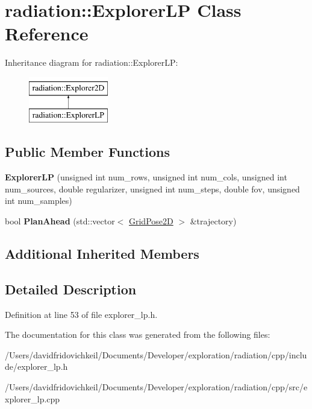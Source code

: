 \hypertarget{classradiation_1_1_explorer_l_p}{}\section{radiation\+:\+:Explorer\+LP Class Reference}
\label{classradiation_1_1_explorer_l_p}
Inheritance diagram for radiation\+:\+:Explorer\+LP\+:\begin{figure}[H]
\begin{center}
\leavevmode
\includegraphics[height=2.000000cm]{classradiation_1_1_explorer_l_p}
\end{center}
\end{figure}
\subsection*{Public Member Functions}
\begin{DoxyCompactItemize}
\item 
\hypertarget{classradiation_1_1_explorer_l_p_a3d37154001011ae4a81c5ee7d26b8f62}{}\label{classradiation_1_1_explorer_l_p_a3d37154001011ae4a81c5ee7d26b8f62} 
{\bfseries Explorer\+LP} (unsigned int num\+\_\+rows, unsigned int num\+\_\+cols, unsigned int num\+\_\+sources, double regularizer, unsigned int num\+\_\+steps, double fov, unsigned int num\+\_\+samples)
\item 
\hypertarget{classradiation_1_1_explorer_l_p_accde83eac496f12dede4737b8a57ce51}{}\label{classradiation_1_1_explorer_l_p_accde83eac496f12dede4737b8a57ce51} 
bool {\bfseries Plan\+Ahead} (std\+::vector$<$ \hyperlink{classradiation_1_1_grid_pose2_d}{Grid\+Pose2D} $>$ \&trajectory)
\end{DoxyCompactItemize}
\subsection*{Additional Inherited Members}


\subsection{Detailed Description}


Definition at line 53 of file explorer\+\_\+lp.\+h.



The documentation for this class was generated from the following files\+:\begin{DoxyCompactItemize}
\item 
/\+Users/davidfridovichkeil/\+Documents/\+Developer/exploration/radiation/cpp/include/explorer\+\_\+lp.\+h\item 
/\+Users/davidfridovichkeil/\+Documents/\+Developer/exploration/radiation/cpp/src/explorer\+\_\+lp.\+cpp\end{DoxyCompactItemize}
